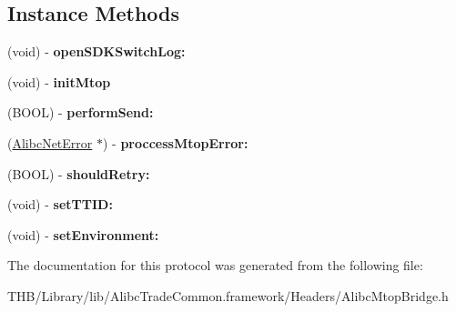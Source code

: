 \subsection*{Instance Methods}
\begin{DoxyCompactItemize}
\item 
\mbox{\label{protocol_alibc_mtop_adapter_01-p_a25550fabfd79c1f28c7ddc6c4c005767}} 
(void) -\/ {\bfseries open\+S\+D\+K\+Switch\+Log\+:}
\item 
\mbox{\label{protocol_alibc_mtop_adapter_01-p_a19ab136d380c271fe9c90c15a2cf8dd3}} 
(void) -\/ {\bfseries init\+Mtop}
\item 
\mbox{\label{protocol_alibc_mtop_adapter_01-p_a95ae2a8b6c01c2bb9e795f7a2eb32491}} 
(B\+O\+OL) -\/ {\bfseries perform\+Send\+:}
\item 
\mbox{\label{protocol_alibc_mtop_adapter_01-p_a744c4bfd13277c86e78caf4c352223d9}} 
(\mbox{\hyperlink{interface_alibc_net_error}{Alibc\+Net\+Error}} $\ast$) -\/ {\bfseries proccess\+Mtop\+Error\+:}
\item 
\mbox{\label{protocol_alibc_mtop_adapter_01-p_ab109b22dbf8250669d4aa5670f81eb38}} 
(B\+O\+OL) -\/ {\bfseries should\+Retry\+:}
\item 
\mbox{\label{protocol_alibc_mtop_adapter_01-p_a8e130f5d461229d60d86e7bccfdd716a}} 
(void) -\/ {\bfseries set\+T\+T\+I\+D\+:}
\item 
\mbox{\label{protocol_alibc_mtop_adapter_01-p_a316381a5acc0924ac5140e15d7bdf38e}} 
(void) -\/ {\bfseries set\+Environment\+:}
\end{DoxyCompactItemize}


The documentation for this protocol was generated from the following file\+:\begin{DoxyCompactItemize}
\item 
T\+H\+B/\+Library/lib/\+Alibc\+Trade\+Common.\+framework/\+Headers/Alibc\+Mtop\+Bridge.\+h\end{DoxyCompactItemize}
